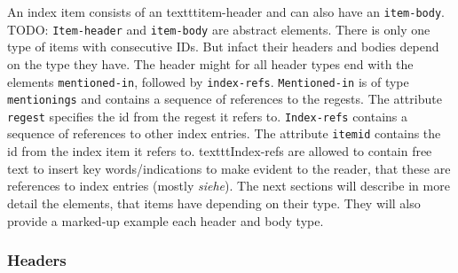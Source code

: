 
An index item consists of an texttt{item-header} and can also have an \texttt{item-body}. TODO: \texttt{Item-header} and \texttt{item-body} are abstract elements. There is only one type of items with consecutive IDs. But infact their headers and bodies depend on the type they have.
The header might for all header types end with the elements \texttt{mentioned-in}, followed by \texttt{index-refs}. \texttt{Mentioned-in} is of type \texttt{mentionings} and contains a sequence of references to the regests. The attribute \texttt{regest} specifies the id from the regest it refers to. \texttt{Index-refs} contains  a sequence of references to other index entries. The attribute \texttt{itemid} contains the id from the index item it refers to. texttt{Index-refs} are allowed to contain free text to insert key words/indications to make evident to the reader, that these are references to index entries (mostly \textit{siehe}).
The next sections will describe in more detail the elements, that items have depending on their type. They will also provide a marked-up example each header and body type.

\subsubsection{Headers}

